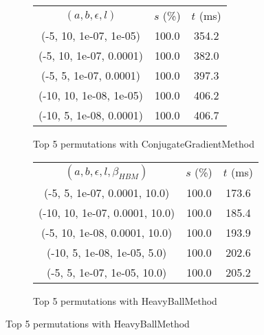 \begin{figure}[H]
{\begin{subfigure}[ht]{.6\textwidth}
\begin{tabular}{|c|c|c|}
\hline
\rowcolor{gray!25}
\multicolumn{3}{|c|}{ConjugateGradientMethod} \\
\hline
\rowcolor{gray!25}
$(a,b,\epsilon,l)$ & $s$ (\%) & $t$ (ms) \\
\hline
(-5, 10, 1e-07, 1e-05) & 100.0 & 354.2 \\
(-5, 10, 1e-07, 0.0001) & 100.0 & 382.0 \\
(-5, 5, 1e-07, 0.0001) & 100.0 & 397.3 \\
(-10, 10, 1e-08, 1e-05) & 100.0 & 406.2 \\
(-10, 5, 1e-08, 0.0001) & 100.0 & 406.7 \\
\hline
\end{tabular}
\caption{Top 5 permutations with ConjugateGradientMethod}
\label{subfig:param_comp_MatrixSquareSum_ConjugateGradientMethod_DichotomousSearch}
\end{subfigure}
\hfill
\begin{subfigure}[ht]{.6\textwidth}
\centering
{}
\begin{tabular}{|c|c|c|}
\hline
\rowcolor{gray!25}
\multicolumn{3}{|c|}{HeavyBallMethod} \\
\hline
\rowcolor{gray!25}
$(a,b,\epsilon,l,\beta_{HBM})$ & $s$ (\%) & $t$ (ms) \\
\hline
(-5, 5, 1e-07, 0.0001, 10.0) & 100.0 & 173.6 \\
(-10, 10, 1e-07, 0.0001, 10.0) & 100.0 & 185.4 \\
(-5, 10, 1e-08, 0.0001, 10.0) & 100.0 & 193.9 \\
(-10, 5, 1e-08, 1e-05, 5.0) & 100.0 & 202.6 \\
(-5, 5, 1e-07, 1e-05, 10.0) & 100.0 & 205.2 \\
\hline
\end{tabular}
\caption{Top 5 permutations with HeavyBallMethod}
\label{subfig:param_comp_MatrixSquareSum_HeavyBallMethod_DichotomousSearch}
\end{subfigure}
}
\end{figure}


